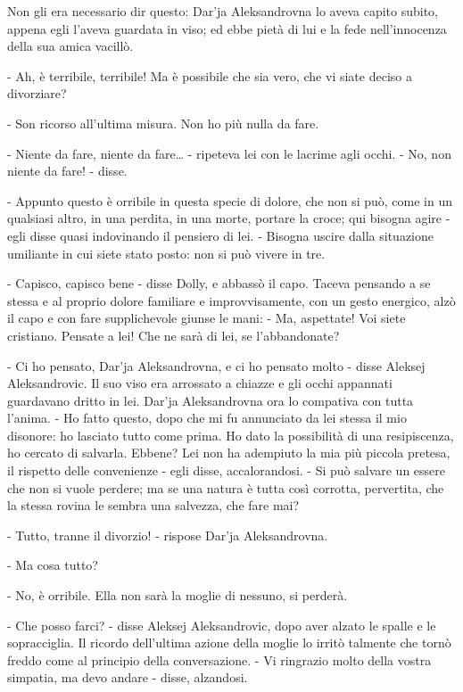 Non gli era necessario dir questo: Dar'ja Aleksandrovna lo aveva capito subito, appena egli l'aveva guardata in viso; ed ebbe pietà di lui e la fede nell'innocenza della sua amica vacillò. 

- Ah, è terribile, terribile! Ma è possibile che sia vero, che vi siate deciso a divorziare? 

- Son ricorso all'ultima misura. Non ho più nulla da fare. 

- Niente da fare, niente da fare\ldots{} - ripeteva lei con le lacrime agli occhi. - No, non niente da fare! - disse. 

- Appunto questo è orribile in questa specie di dolore, che non si può, come in un qualsiasi altro, in una perdita, in una morte, portare la croce; qui bisogna agire - egli disse quasi indovinando il pensiero di lei. - Bisogna uscire dalla situazione umiliante in cui siete stato posto: non si può vivere in tre. 

- Capisco, capisco bene - disse Dolly, e abbassò il capo. Taceva pensando a se stessa e al proprio dolore familiare e improvvisamente, con un gesto energico, alzò il capo e con fare supplichevole giunse le mani: - Ma, aspettate! Voi siete cristiano. Pensate a lei! Che ne sarà di lei, se l'abbandonate? 

- Ci ho pensato, Dar'ja Aleksandrovna, e ci ho pensato molto - disse Aleksej Aleksandrovic. Il suo viso era arrossato a chiazze e gli occhi appannati guardavano dritto in lei. Dar'ja Aleksandrovna ora lo compativa con tutta l'anima. - Ho fatto questo, dopo che mi fu annunciato da lei stessa il mio disonore: ho lasciato tutto come prima. Ho dato la possibilità di una resipiscenza, ho cercato di salvarla. Ebbene? Lei non ha adempiuto la mia più piccola pretesa, il rispetto delle convenienze - egli disse, accalorandosi. - Si può salvare un essere che non si vuole perdere; ma se una natura è tutta così corrotta, pervertita, che la stessa rovina le sembra una salvezza, che fare mai? 

- Tutto, tranne il divorzio! - rispose Dar'ja Aleksandrovna. 

- Ma cosa tutto? 

- No, è orribile. Ella non sarà la moglie di nessuno, si perderà. 

- Che posso farci? - disse Aleksej Aleksandrovic, dopo aver alzato le spalle e le sopracciglia. Il ricordo dell'ultima azione della moglie lo irritò talmente che tornò freddo come al principio della conversazione. - Vi ringrazio molto della vostra simpatia, ma devo andare - disse, alzandosi. 

